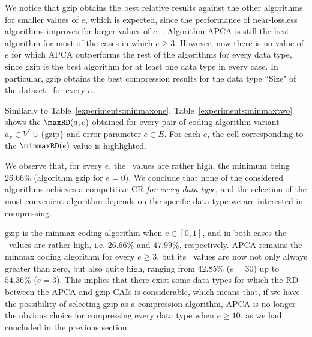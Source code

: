We notice that gzip obtains the best relative results against the other algorithms for smaller values of $e$, which is expected, since the performance of near-lossless algorithms improves for larger values of $e$. . Algorithm APCA is still the best algorithm for most of the cases in which $e \geq 3$. However, now there is no value of $e$ for which APCA outperforms the rest of the algorithms for every data type, since gzip is the best algorithm for at least one data type in every case. In particular, gzip obtains the best compression results for the data type ``Size" of the dataset \datasethail\ for every $e$. 


\clearpage





Similarly to Table~\ref{experiments:minmaxone}, Table~\ref{experiments:minmaxtwo} shows the $\text{\maxRD}(a, e)$ obtained for every pair of coding algorithm variant $a_v \in V^* \cup \{\text{gzip}\}$ and error parameter $e \in E$. For each $e$, the cell corresponding to the $\text{\minmaxRD}(e)$ value is highlighted.


We observe that, for every $e$, the \minmaxRD\ values are rather high, the minimum being $26.66\%$ (algorithm gzip for $e=0$). We conclude that none of the considered algorithms achieves a competitive CR \textit{for every data type}, and the selection of the most convenient algorithm depends on the specific data type we are interested in compressing.


gzip is the minmax coding algorithm when $e \in [0, 1]$, and in both cases the \minmaxRD\ values are rather high, i.e. $26.66\%$ and $47.99\%$, respectively. APCA remains the minmax coding algorithm for every $e \geq 3$, but its \minmaxRD\ values are now not only always greater than zero, but also quite high, ranging from $42.85\%$ ($e=30$) up to $54.36\%$ ($e=3$). This implies that there exist some data types for which the RD between the APCA and gzip CAIs is considerable, which means that, if we have the possibility of selecting gzip as a compression algorithm, APCA is no longer the obvious choice for compressing every data type when $e \geq 10$, as we had concluded in the previous section. 


\clearpage




